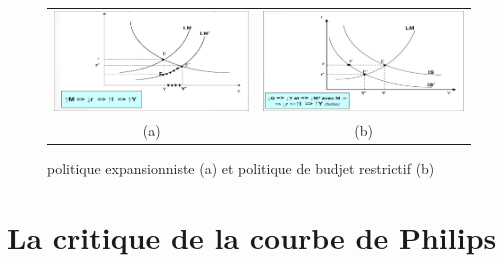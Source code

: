 \begin{figure}[hbt!]
    \centering
    \begin{tabular}{cc}
      \includegraphics[scale=0.2]{Pics/Politque_expansioniste.png} &
      \includegraphics[scale=0.2]{Pics/Politique_budjetaire_restrictive.png} \\
      (a) & (b)\\
    \end{tabular}
    \caption{politique expansionniste (a) et politique de budjet restrictif (b)}
\end{figure}

\newpage
\section{La critique de la courbe de Philips}
